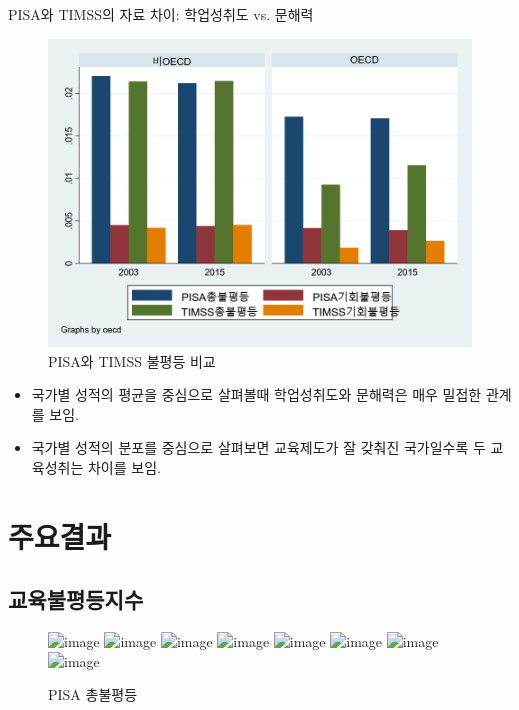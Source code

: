\documentclass[handout, 10pt]{beamer}
\begin{document}
\begin{frame}{PISA와 TIMSS의 자료 차이: 학업성취도 vs. 문해력}
    \begin{figure}[htpb]
        \begin{center}
            \includegraphics[scale=0.1]{pic/bar_pntcompare.png}
            \caption{PISA와 TIMSS 불평등 비교}
        \end{center}
    \end{figure}
    \begin{itemize}
        \item 국가별 성적의 평균을 중심으로 살펴볼때 학업성취도와 문해력은 매우 밀접한 관계를 보임.
        \item 국가별 성적의 분포를 중심으로 살펴보면 교육제도가 잘 갖춰진 국가일수록 두 교육성취는 차이를 보임. 
    \end{itemize}
\end{frame}

\section{주요결과}
\subsection{교육불평등지수}
\begin{frame}
    \begin{figure}[htpb]
        \begin{center}
            \includegraphics<1| handout:1>[scale=0.15]{pic/map_bjtpisa_mean.png}
            \includegraphics<2| handout:0>[scale=0.15]{pic/map_bjtpisa_2000.png}
            \includegraphics<3| handout:0>[scale=0.15]{pic/map_bjtpisa_2003.png}
            \includegraphics<4| handout:0>[scale=0.15]{pic/map_bjtpisa_2006.png}
            \includegraphics<5| handout:0>[scale=0.15]{pic/map_bjtpisa_2009.png}
            \includegraphics<6| handout:0>[scale=0.15]{pic/map_bjtpisa_2012.png}
            \includegraphics<7| handout:0>[scale=0.15]{pic/map_bjtpisa_2015.png}
            \includegraphics<8| handout:0>[scale=0.15]{pic/map_bjtpisa_2018.png}
            \caption{PISA 총불평등}
        \end{center}
    \end{figure}
\end{frame}
\end{document}
